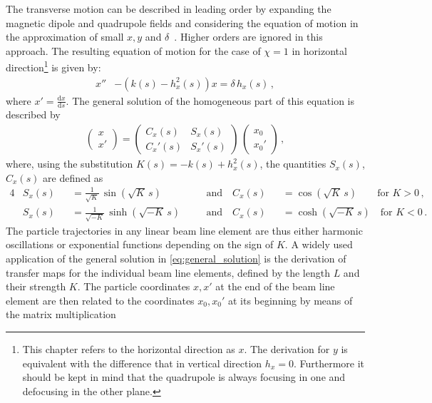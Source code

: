 The transverse motion can be described in leading order by expanding the magnetic dipole and quadrupole fields and considering the equation of motion in the approximation of small $x,y$ and $\delta$~\cite{lee2012accelerator}. Higher orders are ignored in this approach. The resulting equation of motion for the case of $\chi=1$ in horizontal direction\footnote{This chapter refers to the horizontal direction as $x$. The derivation for $y$ is equivalent with the difference that in vertical direction $h_x=0$. Furthermore it should be kept in mind that the quadrupole is always focusing in one and defocusing in the other plane.} is given by:
\begin{align}
x'' &- \left(k(s) - h_x^2(s)\right) x = \delta \, h_x (s) \, , \label{eq:hill1} 
\end{align}
%
where $x'= \frac{\mathrm{d}x}{\mathrm{d}s}$. The general solution of the homogeneous part of this equation is described by 
\begin{align}
\begin{pmatrix} x \\ x' \end{pmatrix} = \begin{pmatrix} C_x (s) & S_x(s) \\ C_x'(s) & S_x'(s)  \end{pmatrix} \, \begin{pmatrix} x_0 \\ x_0' \end{pmatrix}\, , \label{eq:general_solution}
\end{align}
where, using the substitution $K(s) = -k(s)+h_x^2(s)$, the quantities $S_x(s)$, $C_x(s)$ are defined as
%
\begin{alignat}{4}
&S_x(s) &&= \frac{1}{\sqrt{K}} \, \sin \left( \sqrt{K} \, s \right) \quad && \text{and}  \quad  C_x (s) &&= \cos \left(\sqrt{K} \, s\right) \quad \quad \text{for } K>0 \,,\\ 
&S_x(s) &&= \frac{1}{\sqrt{-K}} \, \sinh \left( \sqrt{-K} \, s \right)  \quad && \text{and}  \quad   C_x (s) &&= \cosh \left(\sqrt{-K} \, s\right) \quad  \text{for } K<0\,. 
\end{alignat}
%
The particle trajectories in any linear beam line element are thus either harmonic oscillations or exponential functions depending on the sign of $K$. A widely used application of the general solution in \eqref{eq:general_solution} is the derivation of transfer maps for the individual beam line elements, defined by the length $L$ and their strength $K$. The particle coordinates $x,x'$ at the end of the beam line element are then related to the coordinates $x_0,x_0'$ at its beginning by means of the matrix multiplication
